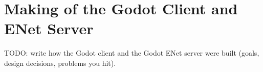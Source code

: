 \documentclass[11pt]{article}
\begin{document}
\section{Making of the Godot Client and ENet Server}
TODO: write how the Godot client and the Godot ENet server were built (goals, design decisions, problems you hit).
\end{document}

